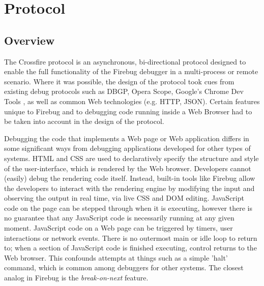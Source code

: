 \section {Protocol}
\subsection {Overview}
The Crossfire protocol is an asynchronous, bi-directional protocol designed to
enable the full functionality of the Firebug debugger in a multi-process or
remote scenario. Where it was possible, the design of the protocol took cues
from existing debug protocols such as DBGP\cite{dbgp}, Opera
Scope\cite{opera-scope}, Google's Chrome Dev Tools\cite{chrome-dev-tools} , as
well as common Web technologies (e.g. HTTP, JSON\cite{json}). Certain
features unique to Firebug and to debugging code running inside a Web Browser
had to be taken into account in the design of the protocol.

Debugging the code that implements a Web page or Web application differs in some
significant ways from debugging applications developed for other types of
systems. HTML and CSS are used to declaratively specify the structure and style of the
user-interface, which is rendered by the Web browser. Developers cannot (easily)
debug the rendering code itself. Instead, built-in tools like Firebug allow the
developers to interact with the rendering engine by modifying the input and
observing the output in real time, via live CSS and DOM editing. JavaScript code
on the page can be stepped through when it is executing, however there is no
guarantee that any JavaScript code is necessarily running at any given moment.
JavaScript code on a Web page can be triggered by timers, user interactions or
network events. There is no outermost main or idle loop to return to; when a
section of JavaScript code is finished executing, control returns to the Web
browser. This confounds attempts at things such as a simple 'halt' command,
which is common among debuggers for other systems. The closest analog in Firebug
is the \textit{break-on-next} feature.

